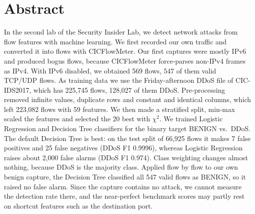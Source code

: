 \chapter*{Abstract}

In the second lab of the Security Insider Lab, we detect network attacks from flow features with machine learning. We first recorded our own traffic and converted it into flows with CICFlowMeter. Our first captures were mostly IPv6 and produced bogus flows, because CICFlowMeter force-parses non-IPv4 frames as IPv4. With IPv6 disabled, we obtained 569 flows, 547 of them valid TCP/UDP flows. As training data we use the Friday-afternoon DDoS file of CIC-IDS2017, which has 225,745 flows, 128,027 of them DDoS. Pre-processing removed infinite values, duplicate rows and constant and identical columns, which left 223,082 flows with 59 features. We then made a stratified split, min-max scaled the features and selected the 20 best with $\chi^2$. We trained Logistic Regression and Decision Tree classifiers for the binary target BENIGN vs.\ DDoS. The default Decision Tree is best: on the test split of 66,925 flows it makes 7 false positives and 25 false negatives (DDoS F1 0.9996), whereas Logistic Regression raises about 2,000 false alarms (DDoS F1 0.974). Class weighting changes almost nothing, because DDoS is the majority class. Applied flow by flow to our own benign capture, the Decision Tree classified all 547 valid flows as BENIGN, so it raised no false alarm. Since the capture contains no attack, we cannot measure the detection rate there, and the near-perfect benchmark scores may partly rest on shortcut features such as the destination port.
